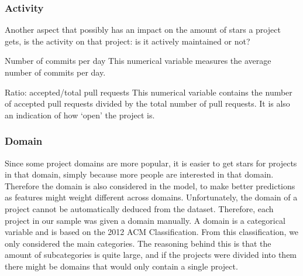 
    \subsubsection{Activity}
        Another aspect that possibly has an impact on the amount of stars a project gets, is the activity on that project: is it actively maintained or not?
    \begin{LaTeXdescription}
        \item[Number of commits per day]
            This numerical variable measures the average number of commits per day.
        \item[Ratio: accepted/total pull requests]
            This numerical variable contains the number of accepted pull requests divided by the total number of pull requests. It is also an indication of how `open' the project is.
    \end{LaTeXdescription}\hspace*{\fill}


 
    \subsubsection{Domain}
        Since some project domains are more popular, it is easier to get stars for projects in that domain, simply because more people are interested in that domain. 
        Therefore the domain is also considered in the model, to make better predictions as features might weight different across domains.
        Unfortunately, the domain of a project cannot be automatically deduced from the dataset.
        Therefore, each project in our sample was given a domain manually.
        A domain is a categorical variable and is based on the 2012 ACM Classification. \cite{acm-2012}
        From this classification, we only considered the main categories.
        The reasoning behind this is that the amount of subcategories is quite large, and if the projects were divided into them there might be domains that would only contain a single project.



